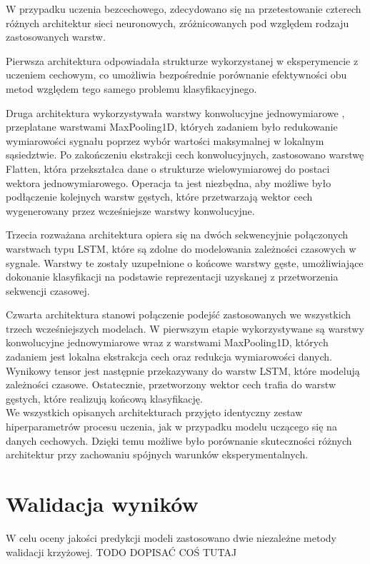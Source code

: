 \documentclass[a4paper,twoside,12pt]{book}
\begin{document}
W przypadku uczenia bezcechowego, zdecydowano się na przetestowanie czterech różnych architektur sieci neuronowych, zróżnicowanych pod względem rodzaju zastosowanych warstw.

Pierwsza architektura odpowiadała strukturze wykorzystanej w eksperymencie z uczeniem cechowym, co umożliwia bezpośrednie porównanie efektywności obu metod względem tego samego problemu klasyfikacyjnego.

Druga architektura wykorzystywała warstwy konwolucyjne jednowymiarowe , przeplatane warstwami MaxPooling1D, których zadaniem było redukowanie wymiarowości sygnału poprzez wybór wartości maksymalnej w lokalnym sąsiedztwie. Po zakończeniu ekstrakcji cech konwolucyjnych, zastosowano warstwę Flatten, która przekształca dane o strukturze wielowymiarowej do postaci wektora jednowymiarowego. Operacja ta jest niezbędna, aby możliwe było podłączenie kolejnych warstw gęstych, które przetwarzają wektor cech wygenerowany przez wcześniejsze warstwy konwolucyjne.

Trzecia rozważana architektura opiera się na dwóch sekwencyjnie połączonych warstwach typu LSTM, które są zdolne do modelowania zależności czasowych w sygnale. Warstwy te zostały uzupełnione o końcowe warstwy gęste, umożliwiające dokonanie klasyfikacji na podstawie reprezentacji uzyskanej z przetworzenia sekwencji czasowej.

Czwarta architektura stanowi połączenie podejść zastosowanych we wszystkich trzech wcześniejszych modelach. W pierwszym etapie wykorzystywane są warstwy konwolucyjne jednowymiarowe wraz z warstwami MaxPooling1D, których zadaniem jest lokalna ekstrakcja cech oraz redukcja wymiarowości danych. Wynikowy tensor jest następnie przekazywany do warstw LSTM, które modelują zależności czasowe. Ostatecznie, przetworzony wektor cech trafia do warstw gęstych, które realizują końcową klasyfikację.\\

We wszystkich opisanych architekturach przyjęto identyczny zestaw hiperparametrów procesu uczenia, jak w przypadku modelu uczącego się na danych cechowych. Dzięki temu możliwe było porównanie skuteczności różnych architektur przy zachowaniu spójnych warunków eksperymentalnych.


\section{Walidacja wyników}
W celu oceny jakości predykcji modeli zastosowano dwie niezależne metody walidacji krzyżowej. TODO DOPISAĆ COŚ TUTAJ\\
\end{document}
